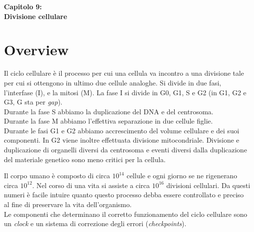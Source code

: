 \Huge\textbf{Capitolo 9: \\Divisione cellulare}\\

\small
\section{Overview}
    Il ciclo cellulare è il processo per cui una cellula va incontro a una divisione tale per cui si ottengono in ultimo due cellule analoghe. Si divide in due fasi, l'interfase (I), e la mitosi (M). La fase I si divide in G0, G1, S e G2 (in G1, G2 e G3, G sta per \textit{gap}).\\
    Durante la fase S abbiamo la duplicazione del DNA e del centrosoma.\\
    Durante la fase M abbiamo l'effettiva separazione in due cellule figlie.\\
    Durante le fasi G1 e G2 abbiamo accrescimento del volume cellulare e dei suoi componenti. In G2 viene inoltre effettuata divisione mitocondriale.
    Divisione e duplicazione di organelli diversi da centrosoma e eventi diversi dalla duplicazione del materiale genetico sono meno critici per la cellula.
    
    \vspace{0.5cm}
    Il corpo umano è composto di circa $10^{14}$ cellule e ogni giorno se ne rigenerano circa $10^{12}$. Nel corso di una vita si assiste a circa $10^{16}$ divisioni cellulari. 
    Da questi numeri è facile intuire quanto questo processo debba essere controllato e preciso al fine di preservare la vita dell'organismo.\\
    Le componenti che determinano il corretto funzionamento del ciclo cellulare sono un \textit{clock} e un sistema di correzione degli errori (\textit{checkpoints}).
    
